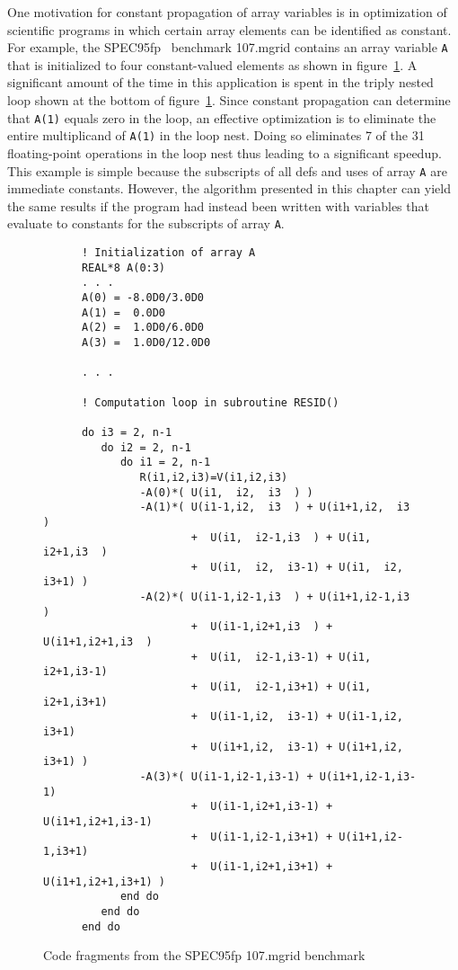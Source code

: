 One motivation for constant propagation of array variables
is in optimization of scientific programs in which certain array elements
can be identified as constant.  For example, 
the SPEC95fp~\cite{SPEC95} benchmark 107.mgrid contains 
an array variable {\tt A} that is initialized to four constant-valued
elements as shown in figure~\ref{fig:mgrid}.  A significant amount of
the time in this application is spent in the triply nested loop 
shown at the bottom of figure~\ref{fig:mgrid}.  Since constant
propagation
can determine that {\tt A(1)} equals zero in the loop, an effective optimization
is to eliminate the entire multiplicand of
{\tt A(1)} in the loop nest.  Doing so eliminates 7 of the 31 floating-point
operations in the loop nest thus leading to a significant speedup.
This example is simple because the subscripts
of all defs and uses of 
array {\tt A} are immediate constants.  However,
the algorithm presented
in this chapter can yield
the same results if the program had instead been written with variables
that evaluate to constants for the subscripts of array {\tt A}.


\begin{figure}
{\footnotesize
\begin{verbatim}
      ! Initialization of array A
      REAL*8 A(0:3)
      . . .
      A(0) = -8.0D0/3.0D0 
      A(1) =  0.0D0 
      A(2) =  1.0D0/6.0D0 
      A(3) =  1.0D0/12.0D0

      . . .

      ! Computation loop in subroutine RESID()

      do i3 = 2, n-1
         do i2 = 2, n-1
            do i1 = 2, n-1
               R(i1,i2,i3)=V(i1,i2,i3)
               -A(0)*( U(i1,  i2,  i3  ) )
               -A(1)*( U(i1-1,i2,  i3  ) + U(i1+1,i2,  i3  )
                       +  U(i1,  i2-1,i3  ) + U(i1,  i2+1,i3  )
                       +  U(i1,  i2,  i3-1) + U(i1,  i2,  i3+1) )
               -A(2)*( U(i1-1,i2-1,i3  ) + U(i1+1,i2-1,i3  )
                       +  U(i1-1,i2+1,i3  ) + U(i1+1,i2+1,i3  )
                       +  U(i1,  i2-1,i3-1) + U(i1,  i2+1,i3-1)
                       +  U(i1,  i2-1,i3+1) + U(i1,  i2+1,i3+1)
                       +  U(i1-1,i2,  i3-1) + U(i1-1,i2,  i3+1)
                       +  U(i1+1,i2,  i3-1) + U(i1+1,i2,  i3+1) )
               -A(3)*( U(i1-1,i2-1,i3-1) + U(i1+1,i2-1,i3-1)
                       +  U(i1-1,i2+1,i3-1) + U(i1+1,i2+1,i3-1)
                       +  U(i1-1,i2-1,i3+1) + U(i1+1,i2-1,i3+1)
                       +  U(i1-1,i2+1,i3+1) + U(i1+1,i2+1,i3+1) )
            end do
         end do
      end do
\end{verbatim}
}
\caption{Code fragments from the SPEC95fp 107.mgrid benchmark}
\label{fig:mgrid}
\end{figure}

